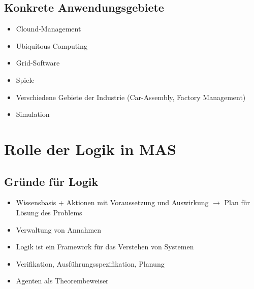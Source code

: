 \documentclass{article} %
\begin{document}
	\subsection{Konkrete Anwendungsgebiete}
	\begin{itemize}
		\item Clound-Management
		\item Ubiquitous Computing
		\item Grid-Software
		\item Spiele
		\item Verschiedene Gebiete der Industrie (Car-Assembly, Factory Management)
		\item Simulation
	\end{itemize}
	
\section{Rolle der Logik in MAS}
	\subsection{Gründe für Logik}
	\begin{itemize}
		\item Wissensbasis + Aktionen mit Voraussetzung und Auswirkung $\rightarrow$ Plan für Lösung des Problems
		\item Verwaltung von Annahmen
		\item Logik ist ein Framework für das Verstehen von Systemen
		\item Verifikation, Ausführungsspezifikation, Planung
		\item Agenten als Theorembeweiser
	\end{itemize}
\end{document}
